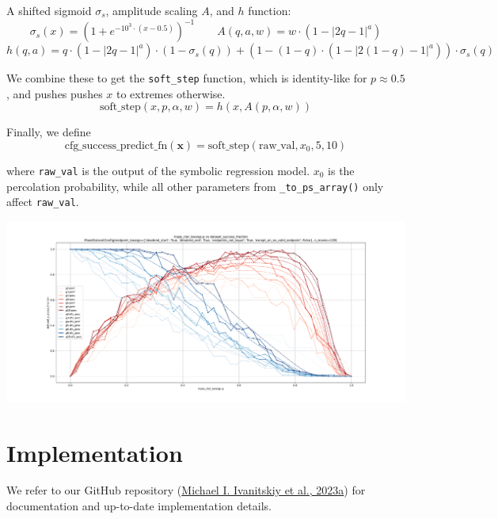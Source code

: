 \documentclass[10pt,a4paper,onecolumn]{article}
\let\origfigure\figure
\let\endorigfigure\endfigure
\renewenvironment{figure}[1][2] {
    \expandafter\origfigure\expandafter[H]
} {
    \endorigfigure
}
\begin{document}
A shifted sigmoid \(\sigma_s\), amplitude scaling \(A\), and \(h\)
function: \[
  \sigma_s(x) = (1 + e^{-10^3 \cdot (x-0.5)})^{-1}
  \qquad A(q,a,w) = w \cdot (1 - |2q-1|^a)
\] \[
  h(q,a) = q \cdot (1 - |2q-1|^a) \cdot (1-\sigma_s(q)) + (1-(1-q) \cdot (1 - |2(1-q)-1|^a)) \cdot \sigma_s(q)
\]

We combine these to get the \texttt{soft\_step} function, which is
identity-like for \(p \approx 0.5\), and pushes pushes \(x\) to extremes
otherwise. \[
  \text{soft\_step}(x, p, \alpha, w) = h(x, A(p, \alpha, w))
\]

Finally, we define \[
  \text{cfg\_success\_predict\_fn}(\mathbf{x}) = \text{soft\_step}(\text{raw\_val}, x_0, 5, 10)
\]

where \texttt{raw\_val} is the output of the symbolic regression model.
\(x_0\) is the percolation probability, while all other parameters from
\texttt{\_to\_ps\_array()} only affect \texttt{raw\_val}.

\begin{figure}
\centering
\includegraphics[width=1\textwidth,height=\textheight]{figures/ep/ep_deadends_unique.pdf}
\caption{An example of both empirical and predicted success rates as a
function of the percolation probability \(p\) for various maze sizes,
percolation with and without depth first search, and
\texttt{endpoint\_kwargs} requiring that both the start and end be in
unique dead ends.}
\end{figure}

\hypertarget{implementation}{%
\section{Implementation}\label{implementation}}

We refer to our GitHub repository
(\protect\hyperlink{ref-maze-dataset-github}{Michael I. Ivanitskiy et
al., 2023a}) for documentation and up-to-date implementation details.
\end{document}
